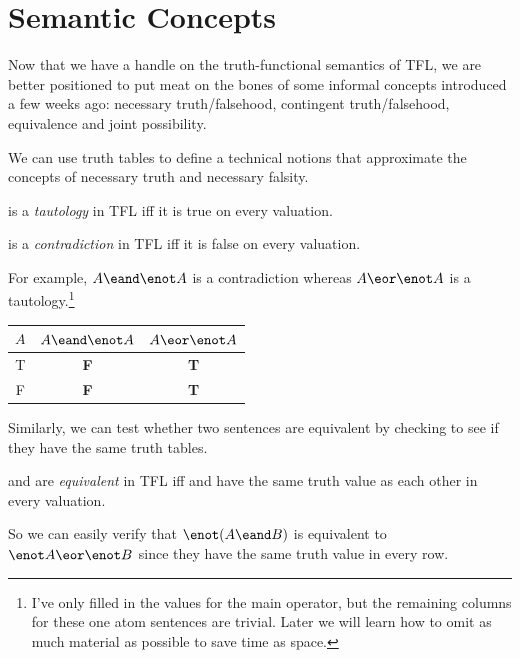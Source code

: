 \section{Semantic Concepts}

Now that we have a handle on the truth-functional semantics of TFL, we are
better positioned to put meat on the bones of some informal concepts introduced
a few weeks ago: necessary truth/falsehood, contingent truth/falsehood,
equivalence and joint possibility.

We can use truth tables to define a technical notions that approximate the
concepts of necessary truth and necessary falsity.

\begin{definition}[Tautology]
  \label{def:tautology}
  \ephi is a \emph{tautology} in TFL iff it is true on every valuation.
\end{definition}

\begin{definition}[Contradiction]
  \label{def:contradiction}
  \ephi is a \emph{contradiction} in TFL iff it is false on every valuation.
\end{definition}

For example, $A \eand \enot A$ is a contradiction whereas $A \eor \enot A$ is
a tautology.\footnote{I've only filled in the values for the main operator, but
the remaining columns for these one atom sentences are trivial. Later we will
learn how to omit as much material as possible to save time as space.}

\begin{center}
  \begin{tabular}{c|c|c}
    $A$ & $A \eand \enot A$ & $A \eor \enot A$ \\
    \hline
    T & \bf{F} & \bf{T} \\
    F & \bf{F} & \bf{T}    
  \end{tabular}
\end{center}

Similarly, we can test whether two sentences are equivalent by checking to
see if they have the same truth tables.

\begin{definition}[Equivalence]
  \label{def:equivalence}
  \ephi and \epsi are \emph{equivalent} in TFL iff \ephi and \epsi have the
  same truth value as each other in every valuation.
\end{definition}

So we can easily verify that $\enot(A\eand B)$ is equivalent to $\enot A \eor
\enot B$ since they have the same truth value in every row.

